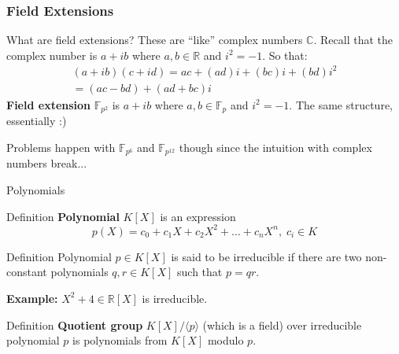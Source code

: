 \documentclass[xcolor={usenames,dvipsnames}]{beamer}
\begin{document}
    \subsubsection{Field Extensions}
    \begin{frame}{What are field extensions?}
        These are ``like'' complex numbers $\mathbb{C}$. Recall that the complex number is $a+ib$ where $a,b \in \mathbb{R}$ and $i^2=-1$. So that:
        \begin{gather*}
            (a+ib)(c+id) = ac+(ad)i+(bc)i+(bd)i^2 \\
            = (ac-bd) + (ad+bc)i
        \end{gather*}
        \pause
        \textbf{Field extension} $\mathbb{F}_{p^2}$ is $a+ib$ where $a,b \in \mathbb{F}_p$ and $i^2=-1$. The same structure, essentially :)
        \pause
        
        Problems happen with $\mathbb{F}_{p^{6}}$ and $\mathbb{F}_{p^{12}}$ though since the intuition with complex numbers break...
    \end{frame}

    \begin{frame}{Polynomials}
        \begin{block}{Definition}
        \textbf{Polynomial} $K[X]$ is an expression
        \begin{equation*}
            p(X) = c_0 + c_1X + c_2X^2 + \dots + c_nX^n, \; c_i \in K
        \end{equation*}
        \end{block}
        \pause
        \begin{block}{Definition}
        Polynomial $p \in K[X]$ is said to be irreducible if there are two non-constant polynomials $q, r \in K[X]$ such that $p=qr$. 
             
        \textbf{Example:} $X^2+4 \in \mathbb{R}[X]$ is irreducible.
        \end{block}
        \pause   
        \begin{block}{Definition}
            \textbf{Quotient group} $K[X]/\langle p\rangle$ (which is a field) over irreducible polynomial $p$ is polynomials from $K[X]$ modulo $p$.
        \end{block}
    \end{frame}
\end{document}
